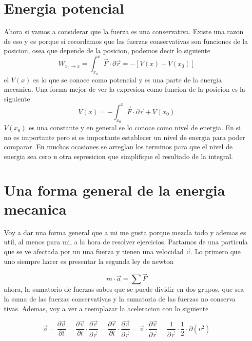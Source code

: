 \documentclass[../Main.tex]{subfiles}
\begin{document}
\npage{
}
{
\section{Energia potencial}

Ahora si vamos a considerar que la fuerza es una conservativa. Existe una razon
de eso y es porque si recordamos que las fuerzas conservativas son funciones
de la posicion, osea que depende de la posicion, podemos decir lo siguiente
\begin{equation*}
     W_{x_0 \rightarrow x} = \int _{x_0}^x \vec{F} \cdot \partial \vec{r} = - \left[ V(x) - V(x_0) \right]
\end{equation*}
el $V(x)$ es lo que se conoce como potencial y es una parte de la energia
mecanica. Una forma mejor de ver la expresion como funcion de la posicion es
la siguiente
\begin{equation*}
     V(x) = - \int _{x_0}^x \vec{F} \cdot \partial \vec{r} + V(x_0)
\end{equation*}
$V(x_0)$ es una constante y en general se lo conoce como nivel de energia. En
si no es importante pero si es importante establecer un nivel de energia para
poder comparar. En muchas ocasiones se arreglan los terminos para que el nivel
de energia sea cero u otra espresicion que simplifique el resultado de la
integral.

\section{Una forma general de la energia mecanica}

Voy a dar una forma general que a mi me gusta porque mezcla todo y ademas es
util, al menos para mi, a la hora de resolver ejercicios. Partamos de una
particula que se ve afectada por un una fuerza y tienen una velocidad $\vec{v}$.
Lo primero que uno siempre hacer es presentar la segunda ley de newton

\begin{equation*}
     m \cdot \vec{a} = \sum{\vec{F}}
\end{equation*}
ahora, la sumatorio de fuerzas sabes que se puede dividir en dos grupos, que sea
la suma de las fuerzas conservativas y la sumatoria de las fuerzas no conserva
tivas. Ademas, voy a ver a reemplazar la aceleracion con lo siguiente

\begin{equation*}
    \vec{a} = \frac{\partial \vec{v}}{\partial t} = \frac{\partial \vec{v}}{\partial t} \cdot \frac{\partial \vec{r}}{\partial \vec{r}} = \frac{\partial \vec{r}}{\partial t} \cdot \frac{\partial \vec{v}}{\partial \vec{r}} = \vec{v} \cdot \frac{\partial \vec{v}}{\partial \vec{r}} = \frac{1}{\partial \vec{r}} \cdot \frac{1}{2} \cdot \partial \left( v^2 \right)
\end{equation*}

}
\end{document}
